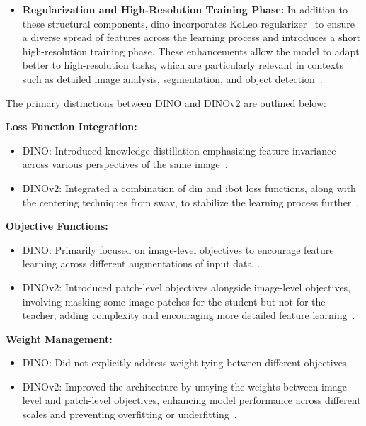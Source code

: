\begin{itemize}
    \item \textbf{Regularization and High-Resolution Training Phase:} In addition to these structural components, \gls{dino} incorporates KoLeo regularizer~\citep{_koleo_sablayrolles2018spreading} to ensure a diverse spread of features across the learning process and introduces a short high-resolution training phase. These enhancements allow the model to adapt better to high-resolution tasks, which are particularly relevant in contexts such as detailed image analysis, segmentation, and object detection~\citep{dinov2_oquab2023dinov2}.
\end{itemize}

The primary distinctions between DINO and DINOv2 are outlined below:

\textbf{Loss Function Integration:}
    \begin{itemize}
        \item DINO: Introduced knowledge distillation emphasizing feature invariance across various perspectives of the same image~\citep{dino_caron2021emerging}.
        \item DINOv2: Integrated a combination of \gls{din} and \gls{ibot} loss functions, along with the centering techniques from \gls{swav}, to stabilize the learning process further~\citep{dinov2_oquab2023dinov2}.
    \end{itemize}
\textbf{Objective Functions:}
    \begin{itemize}
        \item DINO: Primarily focused on image-level objectives to encourage feature learning across different augmentations of input data~\citep{dino_caron2021emerging}.
        \item DINOv2: Introduced patch-level objectives alongside image-level objectives, involving masking some image patches for the student but not for the teacher, adding complexity and encouraging more detailed feature learning~\citep{dinov2_oquab2023dinov2}.
    \end{itemize}
\textbf{Weight Management:}
    \begin{itemize}
        \item DINO: Did not explicitly address weight tying between different objectives.
        \item DINOv2: Improved the architecture by untying the weights between image-level and patch-level objectives, enhancing model performance across different scales and preventing overfitting or underfitting~\citep{dinov2_oquab2023dinov2}.
    \end{itemize}


